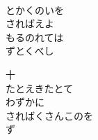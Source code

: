 \documentclass[10pt,b5j]{tarticle} %
\begin{document}
\begin{enumerate}
\begin{minipage}[c]{\blocksize}
    \end{minipage}
    \begin{minipage}[c]{\blocksize}
        
        \vspace{\linespace}
        \item~\\
        とかくのいを\\
        さればえよ\\
        もるのれては\\
        ずとくべし
        
        \vspace{\linespace}
        \item[十]~\\
        たとえきたとて\\
        わずかに\\
        さればくさんこのを\\
        ず
    
    \end{minipage}
\end{enumerate} %
\end{document}
